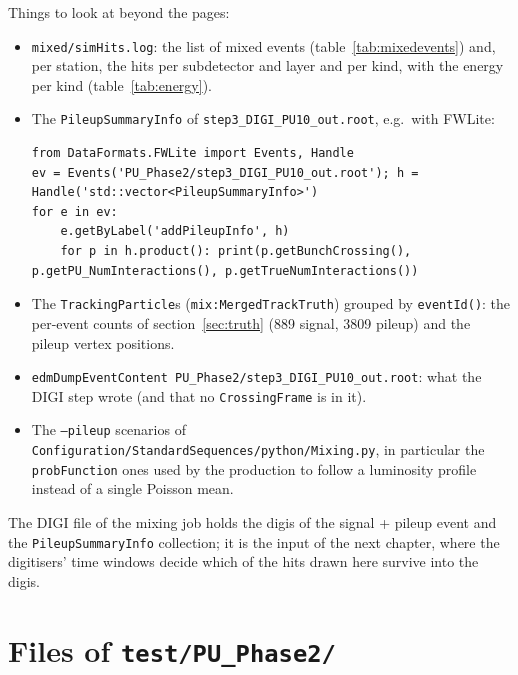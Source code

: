 \documentclass[11pt,a4paper]{article}
\newcommand{\code}[1]{\texttt{#1}}
\begin{document}
Things to look at beyond the pages:
\begin{itemize}
\item \code{mixed/simHits.log}: the list of mixed events (table~\ref{tab:mixedevents}) and, per station, the
  hits per subdetector and layer and per kind, with the energy per kind (table~\ref{tab:energy}).
\item The \code{PileupSummaryInfo} of \code{step3\_DIGI\_PU10\_out.root}, e.g.\ with FWLite:
\begin{lstlisting}[style=py]
from DataFormats.FWLite import Events, Handle
ev = Events('PU_Phase2/step3_DIGI_PU10_out.root'); h = Handle('std::vector<PileupSummaryInfo>')
for e in ev:
    e.getByLabel('addPileupInfo', h)
    for p in h.product(): print(p.getBunchCrossing(), p.getPU_NumInteractions(), p.getTrueNumInteractions())
\end{lstlisting}
\item The \code{TrackingParticle}s (\code{mix:MergedTrackTruth}) grouped by \code{eventId()}: the
  per-event counts of section~\ref{sec:truth} (889 signal, 3809 pileup) and the pileup vertex positions.
\item \code{edmDumpEventContent PU\_Phase2/step3\_DIGI\_PU10\_out.root}: what the DIGI step wrote (and that
  no \code{CrossingFrame} is in it).
\item The \code{--pileup} scenarios of \code{Configuration/StandardSequences/python/Mixing.py}, in
  particular the \code{probFunction} ones used by the production to follow a luminosity profile instead of a
  single Poisson mean.
\end{itemize}

The DIGI file of the mixing job holds the digis of the signal + pileup event and the
\code{PileupSummaryInfo} collection; it is the input of the next chapter, where the digitisers' time windows decide which of the hits drawn here
survive into the digis.

\appendix
\section{Files of \code{test/PU\_Phase2/}}
\label{app:files}
\end{document}
